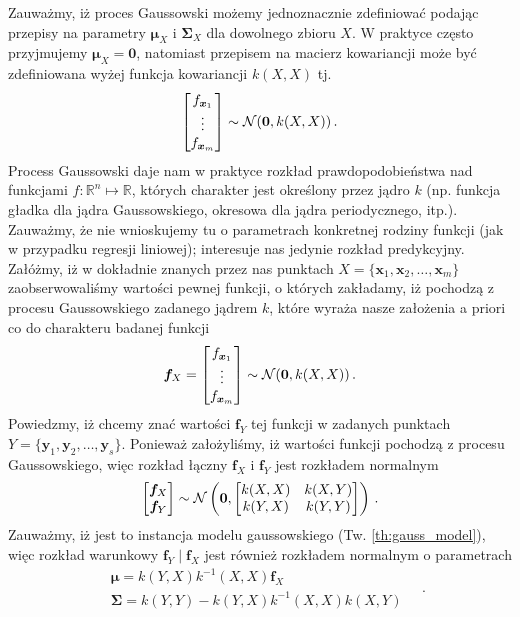 \documentclass{myclass}
\numberwithin{equation}{subsection}
\begin{document}
Zauważmy, iż proces Gaussowski możemy jednoznacznie zdefiniować podając przepisy na parametry
\(\bm{\mu}_X\) i \(\bm{\Sigma}_X\) dla dowolnego zbioru \(X\). W praktyce często przyjmujemy
\(\bm{\mu}_X = \bm{0}\), natomiast przepisem na macierz kowariancji może być zdefiniowana wyżej
funkcja kowariancji \(k(X,X)\) tj.
\begin{equation}
    \mqty[f_{\bm{x}_1} \\ \vdots \\ f_{\bm{x}_m}] \sim \mathcal{N}(\bm{0}, k(X,X))\,.
\end{equation}
Process Gaussowski daje nam w praktyce rozkład prawdopodobieństwa nad funkcjami
\(f:\mathbb{R}^n\mapsto\mathbb{R}\), których charakter jest określony przez jądro \(k\) (np. funkcja
gładka dla jądra Gaussowskiego, okresowa dla jądra periodycznego, itp.). Zauważmy, że nie
wnioskujemy tu o parametrach konkretnej rodziny funkcji (jak w przypadku regresji liniowej);
interesuje nas jedynie rozkład predykcyjny. Załóżmy, iż w dokładnie znanych przez nas punktach \(X =
\{\bm{x}_1,\bm{x}_2,\ldots,\bm{x}_m\}\) zaobserwowaliśmy wartości pewnej funkcji, o których
zakładamy, iż pochodzą z procesu Gaussowskiego zadanego jądrem \(k\), które wyraża nasze założenia a
priori co do charakteru badanej funkcji
\begin{equation}
    \bm{f}_X = \mqty[f_{\bm{x}_1} \\ \vdots \\ f_{\bm{x}_m}] \sim \mathcal{N}(\bm{0}, k(X,X))\,.
\end{equation}
Powiedzmy, iż chcemy znać wartości \(\bm{f}_Y\) tej funkcji w zadanych punktach \(Y =
\{\bm{y}_1,\bm{y}_2,\ldots,\bm{y}_s\}\). Ponieważ założyliśmy, iż wartości funkcji pochodzą z
procesu Gaussowskiego, więc rozkład łączny \(\bm{f}_X\) i \(\bm{f}_Y\) jest rozkładem normalnym
\begin{equation}
    \mqty[\bm{f}_X \\ \bm{f}_Y] \sim \mathcal{N}\left(\bm{0}, \mqty[k(X,X) & k(X,Y) \\ k(Y,X) & k(Y,Y)]\right)\,.
\end{equation}
Zauważmy, iż jest to instancja modelu gaussowskiego (Tw. \ref{th:gauss_model}), więc rozkład
warunkowy \(\bm{f}_Y\mid \bm{f}_X\) jest również rozkładem normalnym o parametrach
\begin{equation}
    \begin{split}
        &\bm{\mu} = k(Y,X)k^{-1}(X,X)\bm{f}_X\\
        &\bm{\Sigma} = k(Y,Y) - k(Y,X)k^{-1}(X,X)k(X,Y)
    \end{split}\quad.
\end{equation}
\end{document}
